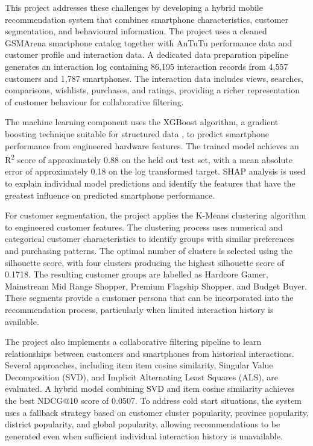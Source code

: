 \documentclass[12pt]{report}
\numberwithin{figure}{chapter}
\numberwithin{table}{chapter}
\numberwithin{equation}{chapter}
\begin{document}
This project addresses these challenges by developing a hybrid mobile recommendation system that combines smartphone characteristics, customer segmentation, and behavioural information. The project uses a cleaned GSMArena smartphone catalog together with AnTuTu performance data and customer profile and interaction data. A dedicated data preparation pipeline generates an interaction log containing 86,195 interaction records from 4,557 customers and 1,787 smartphones. The interaction data includes views, searches, comparisons, wishlists, purchases, and ratings, providing a richer representation of customer behaviour for collaborative filtering.

The machine learning component uses the XGBoost algorithm, a gradient boosting technique suitable for structured data \cite{chen}, to predict smartphone performance from engineered hardware features. The trained model achieves an R\textsuperscript{2} score of approximately 0.88 on the held out test set, with a mean absolute error of approximately 0.18 on the log transformed target. SHAP analysis is used to explain individual model predictions and identify the features that have the greatest influence on predicted smartphone performance.

For customer segmentation, the project applies the K-Means clustering algorithm to engineered customer features. The clustering process uses numerical and categorical customer characteristics to identify groups with similar preferences and purchasing patterns. The optimal number of clusters is selected using the silhouette score, with four clusters producing the highest silhouette score of 0.1718. The resulting customer groups are labelled as Hardcore Gamer, Mainstream Mid Range Shopper, Premium Flagship Shopper, and Budget Buyer. These segments provide a customer persona that can be incorporated into the recommendation process, particularly when limited interaction history is available.

The project also implements a collaborative filtering pipeline to learn relationships between customers and smartphones from historical interactions. Several approaches, including item item cosine similarity, Singular Value Decomposition (SVD), and Implicit Alternating Least Squares (ALS), are evaluated. A hybrid model combining SVD and item cosine similarity achieves the best NDCG@10 score of 0.0507. To address cold start situations, the system uses a fallback strategy based on customer cluster popularity, province popularity, district popularity, and global popularity, allowing recommendations to be generated even when sufficient individual interaction history is unavailable.
\end{document}

